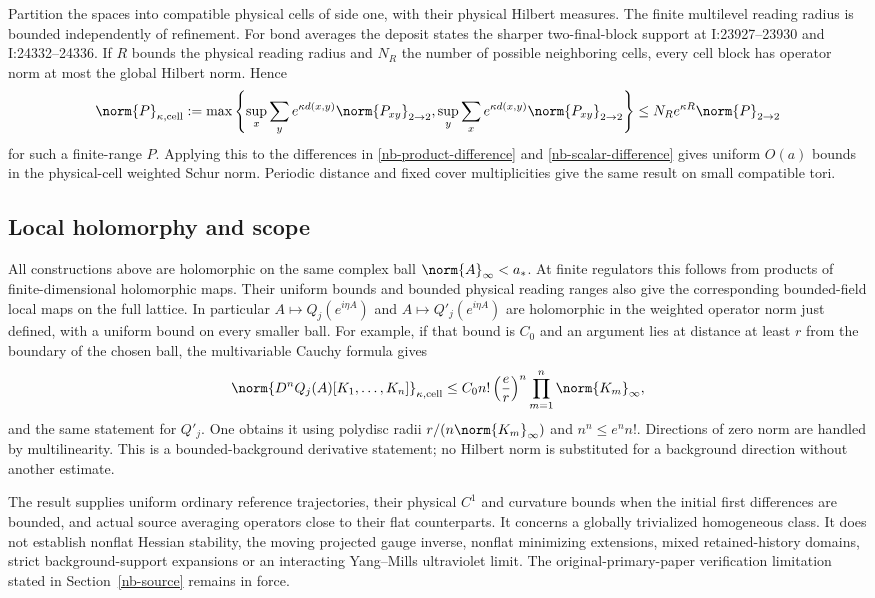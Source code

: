 Partition the spaces into compatible physical cells of side
one, with their physical Hilbert measures. The finite
multilevel reading radius is bounded independently of
refinement. For bond averages the deposit states the sharper
two-final-block support at I:23927--23930 and I:24332--24336.
If $R$ bounds the physical reading radius and $N_R$ the
number of possible neighboring cells, every cell block has
operator norm at most the global Hilbert norm. Hence
\begin{equation}\label{nb-cell-Schur}
 \norm{P}_{\kappa,\mathrm{cell}}
 :=\max\left\{
 \sup_x\sum_y e^{\kappa d(x,y)}\norm{P_{xy}}_{2\to2},
 \sup_y\sum_x e^{\kappa d(x,y)}\norm{P_{xy}}_{2\to2}\right\}
 \le N_Re^{\kappa R}\norm{P}_{2\to2}
\end{equation}
for such a finite-range $P$. Applying this to the differences
in \eqref{nb-product-difference} and
\eqref{nb-scalar-difference} gives uniform $O(a)$ bounds in
the physical-cell weighted Schur norm. Periodic distance and
fixed cover multiplicities give the same result on small
compatible tori.

\subsection{Local holomorphy and scope}

All constructions above are holomorphic on the same complex
ball $\norm{A}_\infty<a_*$. At finite regulators this follows
from products of finite-dimensional holomorphic maps. Their
uniform bounds and bounded physical reading ranges also give
the corresponding bounded-field local maps on the full
lattice. In particular $A\mapsto Q_j(e^{i\eta A})$ and
$A\mapsto Q'_j(e^{i\eta A})$ are holomorphic in the weighted
operator norm just defined, with a uniform bound on every
smaller ball. For example, if that bound is $C_0$ and an
argument lies at distance at least $r$ from the boundary of
the chosen ball, the multivariable Cauchy formula gives
\begin{equation}\label{nb-Cauchy}
 \norm{D^nQ_j(A)[K_1,\ldots,K_n]}_{\kappa,\mathrm{cell}}
 \le C_0 n!\left(\frac er\right)^n
                         \prod_{m=1}^n\norm{K_m}_\infty,
\end{equation}
and the same statement for $Q'_j$. One obtains it using
polydisc radii $r/(n\norm{K_m}_\infty)$ and
$n^n\le e^n n!$. Directions of zero norm are handled by
multilinearity. This is a bounded-background derivative
statement; no Hilbert norm is substituted for a background
direction without another estimate.

The result supplies uniform ordinary reference trajectories,
their physical $C^1$ and curvature bounds when the initial
first differences are bounded, and actual source averaging
operators close to their flat counterparts. It concerns a
globally trivialized homogeneous class. It does not establish
nonflat Hessian stability, the moving projected gauge inverse,
nonflat minimizing extensions, mixed retained-history domains,
strict background-support expansions or an interacting
Yang--Mills ultraviolet limit. The original-primary-paper
verification limitation stated in Section~\ref{nb-source}
remains in force.
